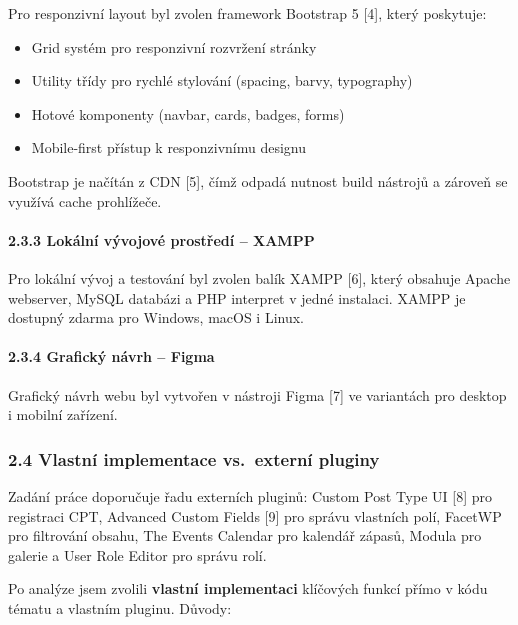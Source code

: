 Pro responzivní layout byl zvolen framework Bootstrap 5 {[}4{]}, který
poskytuje:

\begin{itemize}
\tightlist
\item
  Grid systém pro responzivní rozvržení stránky
\item
  Utility třídy pro rychlé stylování (spacing, barvy, typography)
\item
  Hotové komponenty (navbar, cards, badges, forms)
\item
  Mobile-first přístup k responzivnímu designu
\end{itemize}

Bootstrap je načítán z CDN {[}5{]}, čímž odpadá nutnost build nástrojů a
zároveň se využívá cache prohlížeče.

\paragraph{2.3.3 Lokální vývojové prostředí --
XAMPP}\label{lokuxe1lnuxed-vuxfdvojovuxe9-prostux159eduxed-xampp}

Pro lokální vývoj a testování byl zvolen balík XAMPP {[}6{]}, který
obsahuje Apache webserver, MySQL databázi a PHP interpret v jedné
instalaci. XAMPP je dostupný zdarma pro Windows, macOS i Linux.

\paragraph{2.3.4 Grafický návrh --
Figma}\label{grafickuxfd-nuxe1vrh-figma}

Grafický návrh webu byl vytvořen v nástroji Figma {[}7{]} ve variantách
pro desktop i mobilní zařízení.

\subsubsection{2.4 Vlastní implementace vs.~externí
pluginy}\label{vlastnuxed-implementace-vs.-externuxed-pluginy}

Zadání práce doporučuje řadu externích pluginů: Custom Post Type UI
{[}8{]} pro registraci CPT, Advanced Custom Fields {[}9{]} pro správu
vlastních polí, FacetWP pro filtrování obsahu, The Events Calendar pro
kalendář zápasů, Modula pro galerie a User Role Editor pro správu rolí.

Po analýze jsem zvolili \textbf{vlastní implementaci} klíčových funkcí
přímo v kódu tématu a vlastním pluginu. Důvody:

